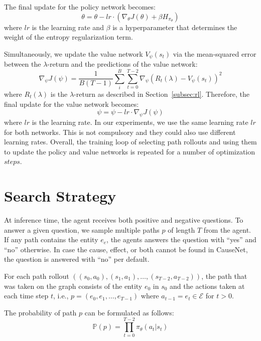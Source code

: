 The final update for the policy network becomes:
\begin{equation}
  \theta = \theta - lr \cdot(\nabla_{\theta} J(\theta) + \beta H_{\pi_\theta})
\end{equation}
where $lr$ is the learning rate and $\beta$ is a hyperparameter 
that determines the weight of the entropy regularization term.

Simultaneously, we update the value network $V_{\psi}(s_t)$ via the mean-squared error between 
the $\lambda$-return and the predictions of the value network:
\begin{equation}
		\nabla_{\psi} J(\psi)= \frac{1}{B (T-1)} \sum_{i}^{B} \sum_{t=0}^{T-2} \nabla_{\psi} (R_t(\lambda) - V_{\psi}(s_t))^2
\end{equation}
where $R_t(\lambda)$ is the $\lambda$-return as described in Section~\ref{subsec:rl}.
Therefore, the final update for the value network becomes:
\begin{equation}
  \psi = \psi - lr \cdot \nabla_{\psi} J(\psi)
\end{equation}
where $lr$ is the learning rate. In our experiments, we use the same learning rate
$lr$ for both networks. This is not compulsory and they could also use 
different learning rates. Overall, the training loop of selecting path rollouts and 
using them to update the policy and value networks is repeated for a number of 
optimization $steps$.


\section{Search Strategy}
\label{sec:search}
At inference time, the agent receives both positive and negative questions.
To answer a given question, we sample multiple paths $p$ of length $T$ from the agent. 
If any path contains the entity $e_e$, the agents answers the question with ``yes'' and ``no'' otherwise.
In case the cause, effect, or both cannot be found in CauseNet, the question 
is answered with ``no'' per default.

For each path rollout $((s_0, a_0),(s_1, a_1), \dots, (s_{T-2}, a_{T-2}))$, the
path that was taken on the graph consists of the entity $e_0$ in $s_0$ and 
the actions taken at each time step $t$, i.e., $p = (e_0, e_1,\dots, e_{T-1})$ where $a_{t-1} = e_t \in \mathcal{E}$ for $t > 0$.

The probability of path $p$ can be formulated as follows:
 \begin{equation}
\mathbb{P}(p) = \prod_{t=0}^{T-2} \pi_{\theta}(a_t |s_t)
\label{eq:decoding}   
 \end{equation}

